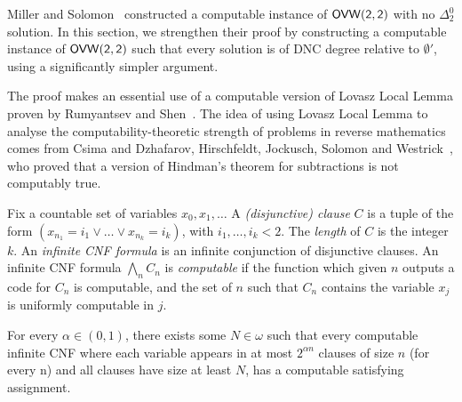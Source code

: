 
Miller and Solomon~\cite{Miller2004Effectiveness} constructed a computable instance of $\sf{OVW}(2,2)$ with no $\Delta^0_2$ solution. In this section, we strengthen their proof by constructing a computable instance of $\sf{OVW}(2,2)$ such that every solution is of DNC degree relative to $\emptyset'$, using a significantly simpler argument.

The proof makes an essential use of a computable version of Lovasz Local Lemma proven by Rumyantsev and Shen~\cite{Rumyantsev2014Probabilistic}. The idea of using Lovasz Local Lemma to analyse the computability-theoretic strength of problems in reverse mathematics comes from Csima and Dzhafarov, Hirschfeldt, Jockusch, Solomon and Westrick~\cite{Csima2018reverse}, who proved that a version of Hindman's theorem for subtractions is not computably true.


\begin{definition}
	Fix a countable set of variables $x_0, x_1, \dots$
	A \emph{(disjunctive) clause} $C$ is a tuple of the form $(x_{n_1} = i_1 \vee \dots \vee x_{n_k} = i_k)$, with $i_1, \dots, i_k < 2$. The \emph{length} of $C$ is the integer $k$. An \emph{infinite CNF formula} is an infinite conjunction of disjunctive clauses. An infinite CNF formula $\bigwedge_n C_n$ is \emph{computable} if the function which given $n$ outputs a code for $C_n$ is computable, and the set of $n$ such that $C_n$ contains the variable $x_j$ is uniformly computable in $j$.
\end{definition}

\begin{theorem}\label{thm:lll-computable}
For every $\alpha \in (0,1)$, there exists some $N \in \omega$ such that every computable infinite CNF where each variable appears in at most $2^{\alpha n}$  clauses of size $n$ (for every n) and all clauses have size at least $N$, has a computable satisfying assignment.
\end{theorem}


